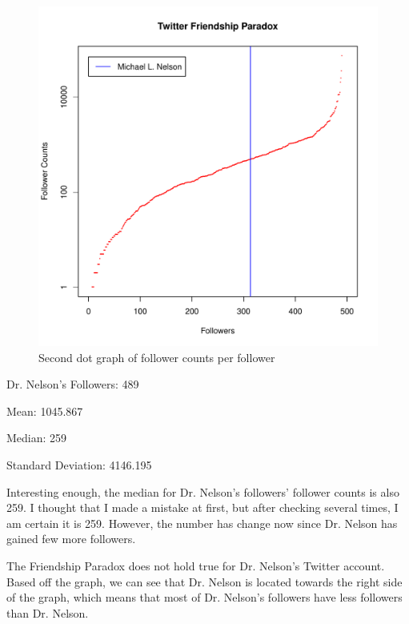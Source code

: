 \documentclass[12pt]{article}
\begin{document}
\begin{figure}[h]
\centering
\includegraphics[width=5in]{TwitterFollowerslg.pdf}
\caption{Second dot graph of follower counts per follower}
\end{figure}

\noindent
Dr. Nelson's Followers: 489

\noindent
Mean: 1045.867

\noindent
Median: 259

\noindent
Standard Deviation: 4146.195

Interesting enough, the median for Dr. Nelson's followers' follower counts is also 259. I thought that I made a mistake at first, but after checking several times, I am certain it is 259. However, the number has change now since Dr. Nelson has gained few more followers. 

The Friendship Paradox does not hold true for Dr. Nelson's Twitter account. Based off the graph, we can see that Dr. Nelson is located towards the right side of the graph, which means that most of Dr. Nelson's followers have less followers than Dr. Nelson.
\end{document}
